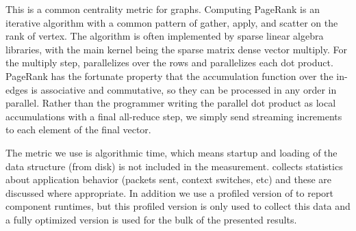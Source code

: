 \vspace{0.5ex}
 This is a common centrality metric for
graphs. Computing PageRank is an iterative algorithm with a common
pattern of gather, apply, and scatter on the rank of vertex. The algorithm
is often implemented by sparse linear algebra libraries, with the main
kernel being the sparse matrix dense vector multiply. For the multiply
step, \Grappa parallelizes over the rows and parallelizes each dot
product. PageRank has the fortunate property that the accumulation
function over the in-edges is associative and commutative, so they can
be processed in any order in parallel. Rather than the programmer writing the
parallel dot product as local accumulations with a final all-reduce
step, we simply send streaming increments to each element of the final
vector.

The metric we use is algorithmic time, which means startup and loading of the
data structure (from disk) is not included in the measurement. \Grappa
collects statistics about application behavior (packets sent, context
switches, etc) and these are discussed where appropriate. In addition we use a
profiled version of \Grappa to report component runtimes, but this profiled
version is only used to collect this data and a fully optimized version is
used for the bulk of the presented results.



